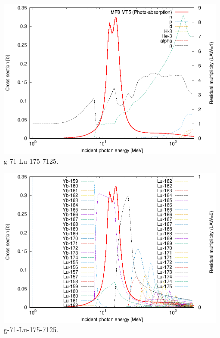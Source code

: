 \begin{figure}
 \includegraphics[width=\linewidth]{eps/g_71-Lu-175_7125.eps}
  \caption{g-71-Lu-175-7125.}
\end{figure}
\begin{figure}
 \includegraphics[width=\linewidth]{eps-law0/g_71-Lu-175_7125.eps}
 \caption{g-71-Lu-175-7125.}
\end{figure}
\newpage \clearpage

